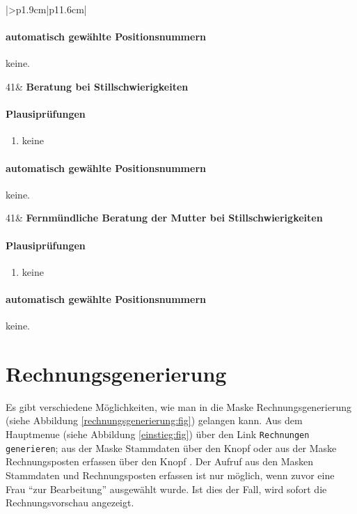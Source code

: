 \begin{mpsupertabular}{|>{\centering}p{1.9cm}|p{11.6cm}|}
\paragraph{automatisch gewählte Positionsnummern}
keine.
\\ \hline


41&
\textbf{Beratung bei Stillschwierigkeiten}
\paragraph{Plausiprüfungen}
\begin{enumerate}
\item
keine
\end{enumerate}
\paragraph{automatisch gewählte Positionsnummern}
keine.
\\ \hline

 
41&
\textbf{Fernmündliche Beratung der Mutter  bei Stillschwierigkeiten}
\paragraph{Plausiprüfungen}
\begin{enumerate}
\item
keine
\end{enumerate}
\paragraph{automatisch gewählte Positionsnummern}
keine.
\\ \hline

\end{mpsupertabular}


\section{Rechnungsgenerierung}\label{rechnungsgenerierung:kap}
Es gibt verschiedene Möglichkeiten, wie man in die Maske Rechnungsgenerierung
(siehe Abbildung \vref{rechnungsgenerierung:fig})
gelangen kann. Aus dem Hauptmenue (siehe Abbildung \vref{einstieg:fig})
über den Link \verb|Rechnungen generieren|;
aus der Maske Stammdaten über den Knopf  oder aus
der Maske Rechnungsposten erfassen über den Knopf .
Der Aufruf aus den Masken Stammdaten und Rechnungsposten erfassen ist nur
möglich, wenn zuvor eine Frau ``zur Bearbeitung'' ausgewählt wurde.
Ist dies der Fall, wird sofort die Rechnungsvorschau angezeigt.

